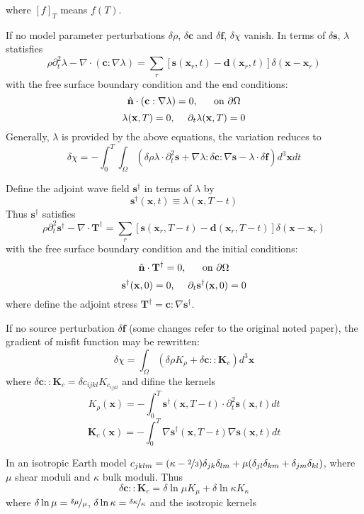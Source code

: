 \documentclass{article}
\newcommand{\mbf}[1]{\mathbf{#1}}
\newcommand{\myno}[1]{{\color{blue}#1}}
\begin{document}
where $[f]_T$ means $f(T)$.\par
If no model parameter perturbations $\delta\rho$, $\delta\mbf c$ and $\delta\mbf f$, $\delta\chi$ vanish. In terms of $\delta\mbf s$, $\lambda$ statisfies
\[ \rho\partial_t^2\lambda-\nabla\cdot(\mbf c:\nabla\lambda)=\sum_r[\mbf s(\mbf x_r,t)-\mbf d(\mbf x_r,t)]\delta(\mbf x-\mbf x_r) \]
with the free surface boundary condition and the end conditions:
\[ \hat{\mbf n}\cdot(\mbf c:\nabla\lambda)=0 \text{,\hspace{5mm} on } \partial\Omega \]
\[ \lambda(\mbf x,T)=0 \text{,\hspace{5mm}} \partial_t\lambda(\mbf x,T)=0 \]
Generally, $\lambda$ is provided by the above equations, the variation reduces to
\[ \delta\chi=-\int_0^T\int_\Omega(\delta\rho\lambda\cdot\partial_t^2\mbf s+\nabla\lambda:\delta\mbf c:\nabla\mbf s-\lambda\cdot\delta\mbf f)d^3\mbf xdt \]\par
Define the adjoint wave field $\mbf s^\dagger$ in terms of $\lambda$ by
\[ \mbf s^\dagger(\mbf x,t)\equiv\lambda(\mbf x,T-t) \]
Thus $\mbf s^\dagger$ satisfies
\[ \rho\partial_t^2\mbf s^\dagger-\nabla\cdot\mbf T^\dagger=\sum_r[\mbf s(\mbf x_r,T-t)-\mbf d(\mbf x_r,T-t)]\delta(\mbf x-\mbf x_r) \]
with the free surface boundary condition and the initial conditions:
\[ \hat{\mbf n}\cdot\mbf T^\dagger=0 \text{,\hspace{5mm} on } \partial\Omega \]
\[ \mbf s^\dagger(\mbf x,0)=0 \text{,\hspace{5mm}} \partial_t\mbf s^\dagger(\mbf x,0)=0 \]
where define the adjoint stress $\mbf T^\dagger=\mbf c:\nabla\mbf s^\dagger$.\par
\myno{If no source perturbation $\delta\mbf f$ (some changes refer to the original noted paper),} the gradient of misfit function may be rewritten:
\[ \delta\chi=\int_\Omega(\delta\rho K_\rho+\delta\mbf c::\mbf K_c)d^3\mbf x \]
where $\delta\mbf c::\mbf K_c=\delta c_{ijkl}K_{c_{ijkl}}$ and difine the kernels
\[ K_\rho(\mbf x)=-\int_0^T\mbf s^\dagger(\mbf x,T-t)\cdot\partial_t^2\mbf s(\mbf x,t)dt \]
\[ \mbf K_c(\mbf x)=-\int_0^T\nabla\mbf s^\dagger(\mbf x,T-t)\nabla\mbf s(\mbf x,t)dt \]\par
In an isotropic Earth model $c_{jklm}=(\kappa-\nicefrac{2}{3})\delta_{jk}\delta_{lm}+\mu(\delta_{jl}\delta_{km}+\delta_{jm}\delta_{kl})$, where $\mu$ shear moduli and $\kappa$ bulk moduli. Thus
\[ \delta\mbf c::\mbf K_c=\delta\ln\mu K_\mu+\delta\ln\kappa K_\kappa \]
where $\delta\ln\mu=\nicefrac{\delta\mu}{\mu}$, $\delta\ln\kappa=\nicefrac{\delta\kappa}{\kappa}$ and the isotropic kernels
\end{document}

